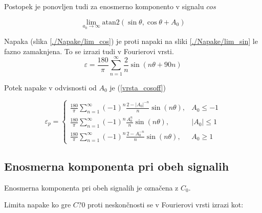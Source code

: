 Postopek je ponovljen tudi za enosmerno komponento v signalu $cos$


\begin{equation}
\lim_{a_0 \rightarrow \infty} \mathrm{atan2}(\sin{\theta},\cos{\theta} + A_0)
\end{equation}

Napaka (slika \ref{./Napake/lim_cos}) je proti napaki na  sliki \ref{./Napake/lim_sin} le fazno zamaknjena.
To se izrazi tudi v Fourierovi vrsti.
\begin{equation}
\varepsilon = \frac{180}{\pi}\sum_{n=1}^{\infty}\frac{2}{n} \sin (n \theta+ 90 n)
\end{equation}

Potek napake v odvisnosti od $A_0$ je (\ref{vrsta_cosoff})

\begin{equation}
\label{vrsta_cosoff}
\varepsilon_p=
\begin{cases}
\frac{180}{\pi}\sum_{n=1}^{\infty}(-1)^n\frac{2-|A_0|^{-n}}{n} \sin (n \theta ), & A_0\leq -1 \\
\frac{180}{\pi}\sum_{n=1}^{\infty}(-1)^n\frac{A_0^n}{n} \sin (n \theta ), & |A_0|\leq 1 \\
\frac{180}{\pi}\sum_{n=1}^{\infty}(-1)^n\frac{2-A_0^{-n}}{n} \sin (n \theta ), & A_0\geq 1
\end{cases}
\end{equation}


\newpage
\subsection{Enosmerna komponenta pri obeh signalih}
\label{2_offseta}
Enosmerna komponenta pri obeh signalih je označena z $C_0$.

Limita napake ko gre $C?0$ proti neskončnosti se v Fourierovi vrsti izrazi kot:


